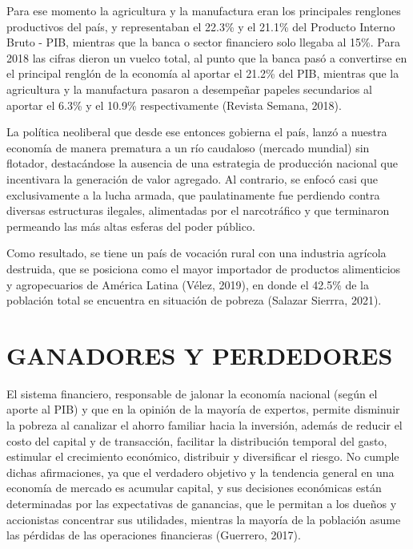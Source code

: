 \documentclass[
]{book}
\begin{document}
Para ese momento la agricultura y la manufactura eran los principales renglones productivos del país, y representaban el 22.3\% y el 21.1\% del Producto Interno Bruto - PIB, mientras que la banca o sector financiero solo llegaba al 15\%. Para 2018 las cifras dieron un vuelco total, al punto que la banca pasó a convertirse en el principal renglón de la economía al aportar el 21.2\% del PIB, mientras que la agricultura y la manufactura pasaron a desempeñar papeles secundarios al aportar el 6.3\% y el 10.9\% respectivamente (Revista Semana, 2018).

La política neoliberal que desde ese entonces gobierna el país, lanzó a nuestra economía de manera prematura a un río caudaloso (mercado mundial) sin flotador, destacándose la ausencia de una estrategia de producción nacional que incentivara la generación de valor agregado. Al contrario, se enfocó casi que exclusivamente a la lucha armada, que paulatinamente fue perdiendo contra diversas estructuras ilegales, alimentadas por el narcotráfico y que terminaron permeando las más altas esferas del poder público.

Como resultado, se tiene un país de vocación rural con una industria agrícola destruida, que se posiciona como el mayor importador de productos alimenticios y agropecuarios de América Latina (Vélez, 2019), en donde el 42.5\% de la población total se encuentra en situación de pobreza (Salazar Sierrra, 2021).

\hypertarget{ganadores-y-perdedores}{%
\chapter{GANADORES Y PERDEDORES}\label{ganadores-y-perdedores}}

El sistema financiero, responsable de jalonar la economía nacional (según el aporte al PIB) y que en la opinión de la mayoría de expertos, permite disminuir la pobreza al canalizar el ahorro familiar hacia la inversión, además de reducir el costo del capital y de transacción, facilitar la distribución temporal del gasto, estimular el crecimiento económico, distribuir y diversificar el riesgo. No cumple dichas afirmaciones, ya que el verdadero objetivo y la tendencia general en una economía de mercado es acumular capital, y sus decisiones económicas están determinadas por las expectativas de ganancias, que le permitan a los dueños y accionistas concentrar sus utilidades, mientras la mayoría de la población asume las pérdidas de las operaciones financieras (Guerrero, 2017).
\end{document}
